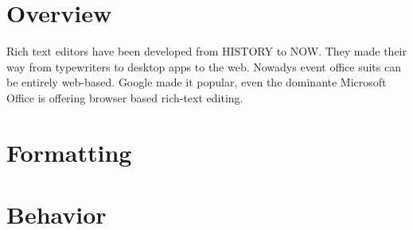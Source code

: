 \section{Overview}

Rich text editors have been developed from HISTORY to NOW. They made their way from typewriters to desktop apps to the web. Nowadys event office suits can be entirely web-based. Google made it popular, even the dominante Microsoft Office is offering browser based rich-text editing.


\section{Formatting}

\section{Behavior}


